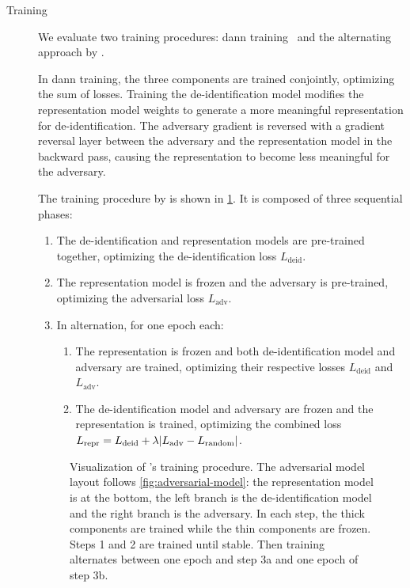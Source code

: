 \begin{description}
    \item[Training]
    We evaluate two training procedures: \ac{dann} training~\citep{ganin2016domain} and the alternating approach by \citet{feutry2018learning}.
    
    In \ac{dann} training, the three components are trained conjointly, optimizing the sum of losses.
    Training the de-identification model modifies the representation model weights to generate a more meaningful representation for de-identification.
    The adversary gradient is reversed with a gradient reversal layer between the adversary and the representation model in the backward pass, causing the representation to become less meaningful for the adversary.
    
    The training procedure by \citet{feutry2018learning} is shown in \cref{fig:feutry-training}.
    It is composed of three sequential phases:
    \begin{enumerate}
        \item The de-identification and representation models are pre-trained together, optimizing the de-identification loss $L_{\text{deid}}$.
        \item The representation model is frozen and the adversary is pre-trained, optimizing the adversarial loss $L_{\text{adv}}$.
        \item In alternation, for one epoch each:
        \begin{enumerate}
            \item The representation is frozen and both de-identification model and adversary are trained, optimizing their respective losses $L_{\text{deid}}$ and $L_{\text{adv}}$.
            \item The de-identification model and adversary are frozen and the representation is trained, optimizing the combined loss $L_{\text{repr}} = L_{\text{deid}} + \lambda \lvert L_{\text{adv}} - L_{\text{random}}\rvert$. \label{item:repr-training}
        \end{enumerate}
    \end{enumerate}
    
    \begin{figure}
        \centering
        
        \caption[Adversarial training procedure]{%
            Visualization of \citeauthor{feutry2018learning}'s training procedure.
            The adversarial model layout follows \cref{fig:adversarial-model}: the representation model is at the bottom, the left branch is the de-identification model and the right branch is the adversary.
            In each step, the thick components are trained while the thin components are frozen.
            Steps 1 and 2 are trained until stable.
            Then training alternates between one epoch and step 3a and one epoch of step 3b.
        }\label{fig:feutry-training}
    \end{figure}
    

\end{description}
